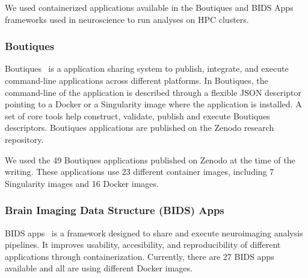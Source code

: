 \documentclass[a4paper,num-refs]{oup-contemporary}
\begin{document}
We used containerized applications available in the Boutiques and BIDS Apps
frameworks used in neuroscience to run analyses on HPC clusters. 

\subsubsection{Boutiques}

Boutiques~\cite{glatard2018boutiques} is a application sharing system to
publish, integrate, and execute command-line applications across different
platforms. In Boutiques, the command-line of the application is described
through a flexible JSON descriptor pointing to a Docker or a Singularity
image where the application is installed. A set of core tools help
construct, validate, publish and execute Boutiques descriptors. Boutiques
applications are published on the Zenodo research repository.

We used the 49 Boutiques applications published on Zenodo at the time of
the writing. These applications use 23 different container images,
including 7 Singularity images and 16 Docker images.

\subsubsection{Brain Imaging Data Structure (BIDS) Apps}

BIDS apps~\cite{gorgolewski2017bids} is a framework designed to share and execute neuroimaging
analysis pipelines. It improves usability, accesibility, and reproducibility
of different applications through containerization.
Currently, there are 27 BIDS apps available and all are using different Docker images.
\end{document}

